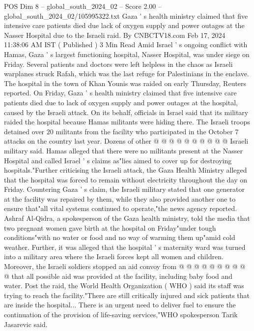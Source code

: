\begin{textsample}{POS Dim 8 – global\_south\_2024\_02 – Score 2.00 – global\_south\_2024\_02/105995322.txt}  \label{ex:f8_pos_389}
Gaza ' s health ministry claimed that five intensive care patients died due lack of oxygen supply and power outages at the Nasser Hospital due to the Israeli raid.
By CNBCTV18.com Feb 17, 2024 11:38:06 AM IST ( Published ) 3 Min Read Amid Israel ' s ongoing conflict with Hamas, Gaza ' s largest functioning hospital, Nasser Hospital, was under siege on Friday.
Several patients and doctors were left helpless in the chaos as Israeli warplanes struck Rafah, which was the last refuge for Palestinians in the enclave.
The hospital in the town of Khan Younis was raided on early Thursday, Reuters reported.
On Friday, Gaza ' s health ministry claimed that five intensive care patients died due to lack of oxygen supply and power outages at the hospital, caused by the Israeli attack.
On its behalf, officials in Israel said that its military raided the hospital because Hamas militants were hiding there.
The Israeli troops detained over 20 militants from the facility who participated in the October 7 attacks on the country last year.
Dozens of other @ @ @ @ @ @ @ @ @ @ Israeli military said.
Hamas alleged that there were no militants present at the Nasser Hospital and called Israel ' s claims as"lies aimed to cover up for destroying hospitals."Further criticising the Israeli attack, the Gaza Health Ministry alleged that the hospital was forced to remain without electricity throughout the day on Friday.
Countering Gaza ' s claim, the Israeli military stated that one generator at the facility was repaired by them, while they also provided another one to ensure that"all vital systems continued to operate,"the news agency reported.
Ashraf Al-Qidra, a spokesperson of the Gaza health ministry, told the media that two pregnant women gave birth at the hospital on Friday"under tough conditions"with no water or food and no way of warming them up"amid cold weather.
Further, it was alleged that the hospital ' s maternity ward was turned into a military area where the Israeli forces kept all women and children.
Moreover, the Israeli soldiers stopped an aid convoy from @ @ @ @ @ @ @ @ @ @ that all possible aid was provided at the facility, including baby food and water.
Post the raid, the World Health Organization ( WHO ) said its staff was trying to reach the facility."There are still critically injured and sick patients that are inside the hospital...
There is an urgent need to deliver fuel to ensure the continuation of the provision of life-saving services,"WHO spokesperson Tarik Jasarevic said.

\end{textsample}
